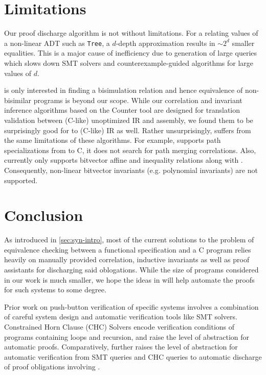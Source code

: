 \vspace{-12px}
\section{Limitations}
\vspace{-10px}
\label{sec:syn-limitations}
Our proof discharge algorithm is not without limitations.
For a \recursiveRelation{} relating values of a non-linear ADT such as {\tt Tree}, a $d$-depth
approximation results in $\sim 2^d$ smaller equalities. This is a major cause of inefficiency due to
generation of large queries which slows down SMT solvers and counterexample-guided algorithms for large values of $d$.

\toolName{} is only interested in finding a bisimulation relation and hence
equivalence of non-bisimilar programs is beyond our scope.
While our correlation and invariant inference algorithms based on the Counter tool \cite{oopsla20}
are designed for translation validation between (C-like) unoptimized IR and assembly, we found them
to be surprisingly good for \SpecL{} to (C-like) IR as well. Rather unsurprisingly, \toolName{}
suffers from the same limitations of these algorithms. For example, \toolName{} supports path
specializations from \SpecL{} to C, it does not search for path merging correlations.
Also, \toolName{} currently only supports bitvector affine and inequality relations
along with \recursiveRelations{}. Consequently, non-linear bitvector
invariants (e.g. polynomial invariants) are not supported.
\vspace{-12px}
\section{Conclusion}
\vspace{-10px}
\label{sec:syn-conclusion}
As introduced in \cref{sec:syn-intro}, most of the current solutions
to the problem of equivalence checking between a functional specification
and a C program relies heavily on manually provided correlation, inductive
invariants as well as proof assistants for discharging said oblogations.
While the size of programs considered in our work is much smaller,
we hope the ideas in \toolName{} will help
automate the proofs for such systems to some degree.

Prior work on push-button verification of specific
systems \cite{fscq,hyperkernel,serval,verifiedBPF}
involves a combination of careful system design and
automatic verification tools like SMT solvers.
Constrained Horn Clause (CHC) Solvers \cite{CHCeq}
encode verification conditions of programs containing loops and recursion,
and raise the level of abstraction for automatic proofs.
Comparatively, \toolName{} further raises the level
of abstraction for automatic verification from
SMT queries and CHC queries to automatic discharge of
proof obligations involving \recursiveRelations{}.

